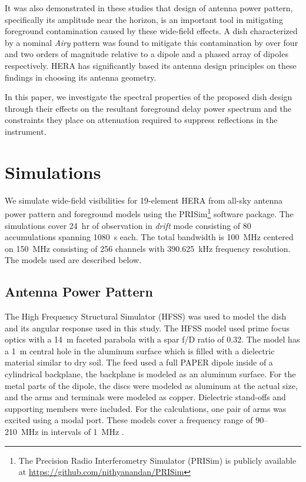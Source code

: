 \documentclass[preprint2,iop,numberedappendix,twocolappendix,appendixfloats]{emulateapj}
\begin{document}
It was also demonstrated in these studies that design of antenna power pattern, specifically its amplitude near the horizon, is an important tool in mitigating foreground contamination caused by these wide-field effects. A dish characterized by a nominal {\it Airy} pattern was found to mitigate this contamination by over four and two orders of magnitude relative to a dipole and a phased array of dipoles respectively. HERA has significantly based its antenna design principles on these findings in choosing its antenna geometry.

In this paper, we investigate the spectral properties of the proposed dish design through their effects on the resultant foreground delay power spectrum and the constraints they place on attenuation required to suppress reflections in the instrument. 

\section{Simulations}\label{sec:sim}

We simulate wide-field visibilities for 19-element HERA from all-sky antenna power pattern and foreground models using the PRISim\footnote{The Precision Radio Interferometry Simulator (PRISim) is publicly available at \url{https://github.com/nithyanandan/PRISim}} software package. The simulations cover 24~hr of observation in {\it drift} mode consisting of 80 accumulations spanning 1080~s each. The total bandwidth is 100~MHz centered on 150~MHz consisting of 256 channels with 390.625~kHz frequency resolution. The models used are described below.

\subsection{Antenna Power Pattern}\label{sec:beam-model}

The High Frequency Structural Simulator (HFSS) was used to model the dish and its angular response used in this study. The HFSS model used prime focus optics with a 14~m faceted parabola with a spar f/D ratio of 0.32.  The model has a 1~m central hole in the aluminum surface which is filled with a dielectric material similar to dry soil. The feed used a full PAPER dipole inside of a cylindrical backplane, the backplane is modeled as an aluminum surface. For the metal parts of the dipole, the discs were modeled as aluminum at the actual size, and the arms and terminals were modeled as copper. Dielectric stand-offs and supporting members were included. For the calculations, one pair of arms was excited using a modal port. These models cover a frequency range of 90--210~MHz in intervals of 1~MHz \citep{deb16}. 
\end{document}
